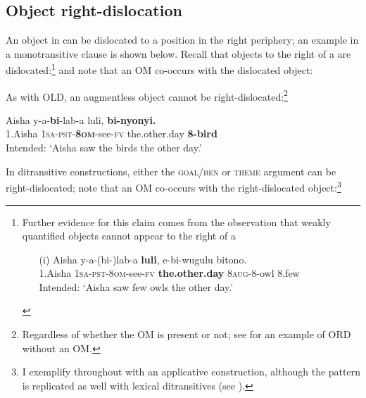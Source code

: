 \documentclass[output=paper
,newtxmath
,modfonts
,nonflat]{langsci/langscibook}
\begin{document}
\subsection{Object right-dislocation}\label{sec:ranero:3.3}

An object in  can be dislocated to a position in the right periphery; an example in a monotransitive clause is shown below. Recall that objects to the right of a  are dislocated:\footnote{Further evidence for this claim comes from the observation that weakly quantified objects cannot appear to the right of a 

\begin{enumerate}
\item[(i)] \gll *Aisha   y-a-(bi-)lab-a             \textbf{luli},                e-bi-wugulu  bitono.\\
	1.Aisha  \textsc{1sa-pst-8om}{}-see-\textsc{fv} \textbf{the.other.day} 8\textsc{aug}{}-8-owl  8.few\\
	\glt Intended: ‘Aisha saw few owls the other day.’
\end{enumerate}
} and note that an OM co-occurs with the dislocated object: 


\z

As with OLD, an augmentless object cannot be right-dislocated:\footnote{Regardless of whether the OM is present or not; see  for an example of ORD without an OM.}

\ea[*]       \label{ex:ranero:22}
\gll Aisha  y-a-\textbf{bi}{}-lab-a         luli,         \textbf{bi-nyonyi.}\\
1.Aisha \textsc{1sa-pst-}\textbf{8\textsc{om}}{}-see\textsc{{}-fv}  the.other.day \textbf{8-bird}\\
\glt Intended: ‘Aisha saw the birds the other day.’ 
\z

In ditransitive constructions, either the \textsc{goal/ben} or \textsc{theme} argument can be right-dislocated; note that an OM co-occurs with the right-dislocated object:\footnote{I exemplify throughout with an applicative construction, although the pattern is replicated as well with lexical ditransitives (see \citealt{ranero2015}).}
\end{document}
